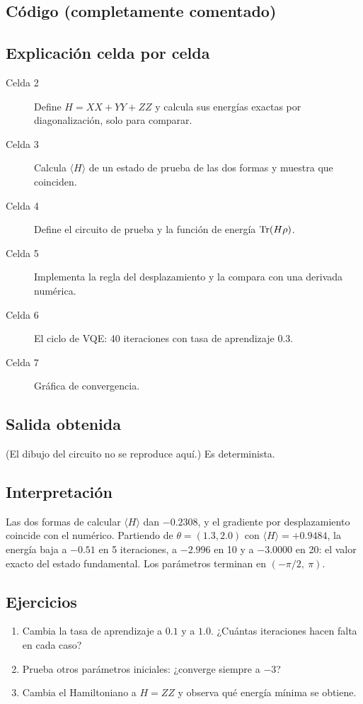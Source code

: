 \subsection{Código (completamente comentado)}


\subsection{Explicación celda por celda}
\begin{description}
  \item[Celda 2] Define $H=XX+YY+ZZ$ y calcula sus energías exactas por
    diagonalización, solo para comparar.
  \item[Celda 3] Calcula $\langle H\rangle$ de un estado de prueba de las dos formas
    y muestra que coinciden.
  \item[Celda 4] Define el circuito de prueba y la función de energía
    $\operatorname{Tr}(H\rho)$.
  \item[Celda 5] Implementa la regla del desplazamiento y la compara con una
    derivada numérica.
  \item[Celda 6] El ciclo de VQE: 40 iteraciones con tasa de aprendizaje $0.3$.
  \item[Celda 7] Gráfica de convergencia.
\end{description}

\subsection{Salida obtenida}

(El dibujo del circuito no se reproduce aquí.) Es determinista.

\subsection{Interpretación}
Las dos formas de calcular $\langle H\rangle$ dan $-0.2308$, y el gradiente
por desplazamiento coincide con el numérico. Partiendo de
$\theta=(1.3,2.0)$ con $\langle H\rangle=+0.9484$, la energía baja a $-0.51$ en 5
iteraciones, a $-2.996$ en 10 y a $-3.0000$ en 20: el valor exacto del estado
fundamental. Los parámetros terminan en $(-\pi/2,\ \pi)$.

\subsection{Ejercicios}
\begin{enumerate}
  \item Cambia la tasa de aprendizaje a $0.1$ y a $1.0$. ¿Cuántas iteraciones
    hacen falta en cada caso?
  \item Prueba otros parámetros iniciales: ¿converge siempre a $-3$?
  \item Cambia el Hamiltoniano a $H=ZZ$ y observa qué energía mínima se
    obtiene.
\end{enumerate}

